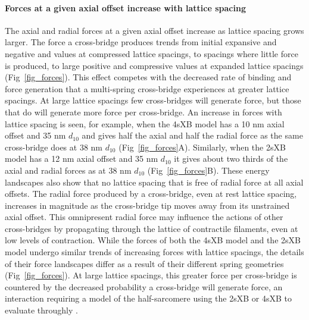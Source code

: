 \documentclass[10pt]{article}
\newcommand{\citep}[1]{\cite{#1}} %
\begin{document}
\paragraph{Forces at a given axial offset increase with lattice spacing} %
The axial and radial forces at a given axial offset increase as lattice spacing grows larger.
The force a cross-bridge produces trends from initial expansive and negative and values at compressed lattice spacings, to spacings where little force is produced, to large positive and compressive values at expanded lattice spacings (Fig~\ref{fig_forces}). 
This effect competes with the decreased rate of binding and force generation that a multi-spring cross-bridge experiences at greater lattice spacings. 
At large lattice spacings few cross-bridges will generate force, but those that do will generate more force per cross-bridge. 
An increase in forces with lattice spacing is seen, for example, when the 4sXB model has a 10 nm axial offset and 35 nm $d_{10}$  and gives half the axial and half the radial force as the same cross-bridge does at 38 nm $d_{10}$ (Fig~\ref{fig_forces}A). 
Similarly, when the 2sXB model has a 12 nm axial offset and 35 nm $d_{10}$ it gives about two thirds of the axial and radial forces as at 38 nm $d_{10}$ (Fig~\ref{fig_forces}B).  
These energy landscapes also show that no lattice spacing that is free of radial force at all axial offsets.  
The radial force produced by a cross-bridge, even at rest lattice spacing, increases in magnitude as the cross-bridge tip moves away from its unstrained axial offset. 
This omnipresent radial force may influence the actions of other cross-bridges by propagating through the lattice of contractile filaments, even at low levels of contraction.
While the forces of both the 4sXB model and the 2sXB model undergo similar trends of increasing forces with lattice spacings, the details of their force landscapes differ as a result of their different spring geometries (Fig~\ref{fig_forces}). 
At large lattice spacings, this greater force per cross-bridge is countered by the decreased probability a cross-bridge will generate force, an interaction requiring a model of the half-sarcomere using the 2sXB or 4sXB to evaluate throughly \citep{Martyn2004}. 
\end{document}
